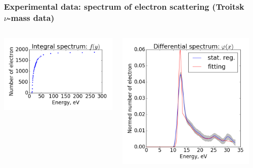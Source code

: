 \documentclass[8pt,pdf,hyperref={unicode}]{beamer}
\begin{document}
\begin{frame}    
    \frametitle{Experimental data: spectrum of electron scattering (Troitsk $\nu$-mass data)}
    \begin{columns}
        \begin{column}{0.5\textwidth}
            \includegraphics[width=\textwidth]{image/fig08.png}
        \end{column}
        \begin{column}{0.5\textwidth}
            \includegraphics[width=\textwidth]{image/fig07.png}
        \end{column}
    \end{columns}  
\end{frame}
\end{document}
